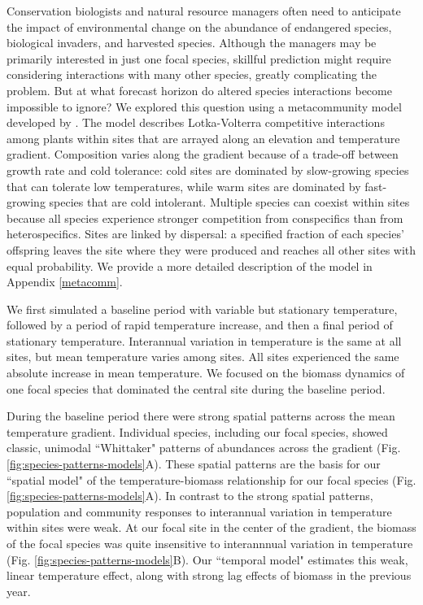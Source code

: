 \documentclass[11pt]{article}
\begin{document}
Conservation biologists and natural resource managers often need to anticipate the impact of environmental change on the abundance of 
endangered species, biological invaders, and harvested species. Although the managers may be primarily interested in just one focal species, skillful prediction might require considering interactions with many other species, greatly complicating the problem. But at what forecast horizon do altered species interactions become impossible to ignore? We explored this question using a metacommunity model developed by \cite{alexander_lags_2018}. The model describes Lotka-Volterra competitive interactions among plants within sites that are arrayed along an elevation and temperature gradient. Composition varies along the gradient because of a trade-off between growth rate and cold tolerance: cold sites are dominated by slow-growing species that can tolerate low temperatures, while warm sites are dominated by  fast-growing species that are cold intolerant. Multiple species can coexist within sites because all species experience stronger competition from conspecifics than from heterospecifics. Sites are linked by dispersal: a specified fraction of each species' offspring leaves the site where they were produced and reaches all other sites with equal probability. We provide a more detailed description of the model in Appendix \ref{metacomm}.

We first simulated a baseline period with variable but stationary temperature, followed by a period of rapid temperature increase, and then a final period of stationary temperature. Interannual variation in temperature is the same at all sites, but mean temperature varies among sites. All sites experienced the same absolute increase in mean temperature. We focused on the biomass dynamics of one focal species that dominated the central site during the baseline period.

During the baseline period there were strong spatial patterns across the mean temperature gradient. 
Individual species, including our focal species, showed classic, unimodal ``Whittaker" patterns of abundances across the gradient (Fig. \ref{fig:species-patterns-models}A).
These spatial patterns are the basis for our ``spatial model" of the temperature-biomass relationship for our focal species (Fig. \ref{fig:species-patterns-models}A). 
In contrast to the strong spatial patterns, population and community responses to interannual variation in temperature within sites were weak.
At our focal site in the center of the gradient, the biomass of the focal species was quite insensitive to interannnual variation in temperature (Fig. \ref{fig:species-patterns-models}B). Our ``temporal model" estimates this weak, linear temperature effect, along with strong lag effects of biomass in the previous year. 
\end{document}
